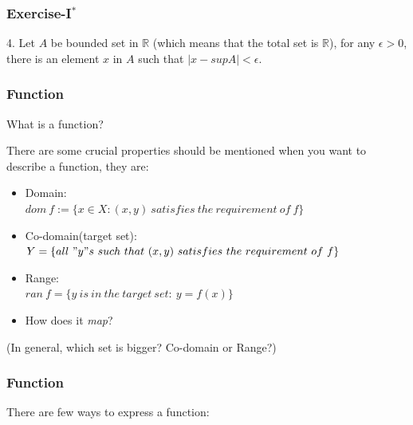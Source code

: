 \documentclass[12pt, t]{beamer}
\renewcommand{\emph}[1]{{\color{Turquoise3}\textsl{#1}}}
\begin{document}
\begin{frame}
    \frametitle{Exercise-I$^*$}
4. Let $A$ be bounded set in $\mathbb{R}$ (which means that the total set is $\mathbb{R}$), for any $\epsilon>0$, 
there is an element $x$ in $A$ such that $|x-supA|<\epsilon$.
\end{frame}

\begin{frame}
    \frametitle{Function}
\begin{center}   
    What is a function?\\
\end{center}
 There are some crucial properties should be mentioned when you want to describe a function, they are:
\begin{itemize}
    \item Domain:\\
        $dom\ f:=\{x\in X: (x,y)\ satisfies\ the\ requirement\ of\ f\}$
    \item Co-domain(target set): \\
        $Y=\{all\ "y"s\ such\ that\ (x,y)\ satisfies\ the\ requirement\ of\ f\}$
    \item Range:\\
        $ran\ f=\{y\ is\ in\ the\ target\ set:\ y=f(x)\}$
    \item How does it \emph{map}?
\end{itemize}
(In general, which set is bigger? Co-domain or Range?)
\end{frame}

\begin{frame}
    \frametitle{Function}
There are few ways to express a function:
\vspace{2em}
\begin{table}
    \centering
\end{table}
\end{frame}
\end{document}
